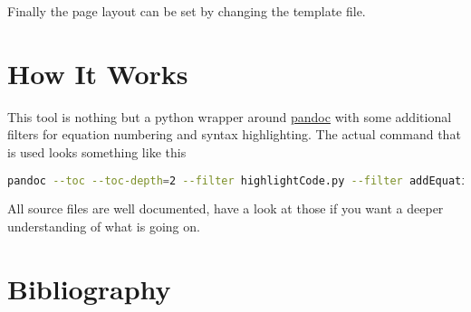 \documentclass[11pt, a4paper]{article}
\begin{document}
	Finally the page layout can be set by changing the template file.
	
	\section{How It Works}
	This tool is nothing but a python wrapper around \href{https://pandoc.org}{pandoc} with some additional filters for equation numbering and syntax highlighting. The actual command that is used looks something like this
	\begin{lstlisting}[language=bash]
	pandoc --toc --toc-depth=2 --filter highlightCode.py --filter addEquationNumbers.py --mathml --standalone --bibliography=<path/to/bib> --template canvasTemplate.html -f latex -t html input.tex -o output.html
	\end{lstlisting}
	All source files are well documented, have a look at those if you want a deeper understanding of what is going on.
	
	
	
	\section{Bibliography}
	
	
	
\end{document}
